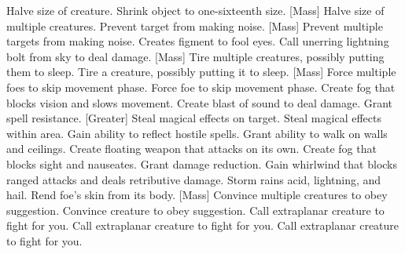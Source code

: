     {Halve size of creature.}
    {Shrink object to one-sixteenth size.}
[Mass]
    {Halve size of multiple creatures.}
    {Prevent target from making noise.}
[Mass]
    {Prevent multiple targets from making noise.}
    {Creates figment to fool eyes.}
    {Call unerring lightning bolt from sky to deal damage.}
[Mass]
    {Tire multiple creatures, possibly putting them to sleep.}
    {Tire a creature, possibly putting it to sleep.}
[Mass]
    {Force multiple foes to skip movement phase.}
    {Force foe to skip movement phase.}
    {Create fog that blocks vision and slows movement.}
    {Create blast of sound to deal damage.}
    {Grant spell resistance.}
[Greater]
    {Steal magical effects on target.}
    {Steal magical effects within area.}
    {Gain ability to reflect hostile spells.}
    {Grant ability to walk on walls and ceilings.}
    {Create floating weapon that attacks on its own.}
    {Create fog that blocks sight and nauseates.}
    {Grant damage reduction.}
    {Gain whirlwind that blocks ranged attacks and deals retributive damage.}
    {Storm rains acid, lightning, and hail.}
    {Rend foe's skin from its body.}
[Mass]
    {Convince multiple creatures to obey suggestion.}
    {Convince creature to obey suggestion.}
    {Call extraplanar creature to fight for you.}
    {Call extraplanar creature to fight for you.}
    {Call extraplanar creature to fight for you.}
